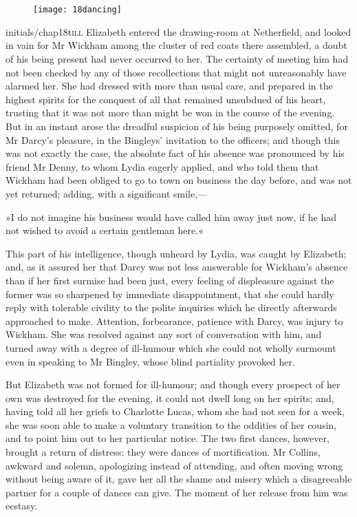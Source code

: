 \chapter[Chapter \thechapter]{}
	
\begin{figure}[t!]
\centering
\texttt{[image: 18dancing]}
\end{figure}
\lettrine[lines=6,image=true]{initials/chap18t}{ill}  Elizabeth entered the drawing-room at Netherfield, and looked in vain for Mr Wickham among the cluster of red coats there assembled, a doubt of his being present had never occurred to her. The certainty of meeting him had not been checked by any of those recollections that might not unreasonably have alarmed her. She had dressed with more than usual care, and prepared in the highest spirits for the conquest of all that remained unsubdued of his heart, trusting that it was not more than might be won in the course of the evening. But in an instant arose the dreadful suspicion of his being purposely omitted, for Mr Darcy's pleasure, in the Bingleys' invitation to the officers; and though this was not exactly the case, the absolute fact of his absence was pronounced by his friend Mr Denny, to whom Lydia eagerly applied, and who told them that Wickham had been obliged to go to town on business the day before, and was not yet returned; adding, with a significant smile,—

»I do not imagine his business would have called him away just now, if he had not wished to avoid a certain gentleman here.«

This part of his intelligence, though unheard by Lydia, was caught by Elizabeth; and, as it assured her that Darcy was not less answerable for Wickham's absence than if her first surmise had been just, every feeling of displeasure against the former was so sharpened by immediate disappointment, that she could hardly reply with tolerable civility to the polite inquiries which he directly afterwards approached to make. Attention, forbearance, patience with Darcy, was injury to Wickham. She was resolved against any sort of conversation with him, and turned away with a degree of ill-humour which she could not wholly surmount even in speaking to Mr Bingley, whose blind partiality provoked her.

But Elizabeth was not formed for ill-humour; and though every prospect of her own was destroyed for the evening, it could not dwell long on her spirits; and, having told all her griefs to Charlotte Lucas, whom she had not seen for a week, she was soon able to make a voluntary transition to the oddities of her cousin, and to point him out to her particular notice. The two first dances, however, brought a return of distress: they were dances of mortification. Mr Collins, awkward and solemn, apologizing instead of attending, and often moving wrong without being aware of it, gave her all the shame and misery which a disagreeable partner for a couple of dances can give. The moment of her release from him was ecstasy.

